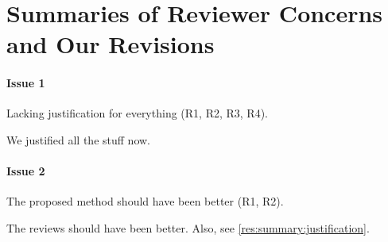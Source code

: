 
\section{Summaries of Reviewer Concerns and Our Revisions} \label{sec:summary}

\paragraph{Issue 1}
Lacking justification for everything (R1, R2, R3, R4). 

\begin{response} \label{res:summary:justification}
We justified all the stuff now.
\end{response}


\paragraph{Issue 2}
The proposed method should have been better (R1, R2).

\begin{response} \label{res:summary:better}
The reviews should have been better. Also, see \autoref{res:summary:justification}.
\end{response}

